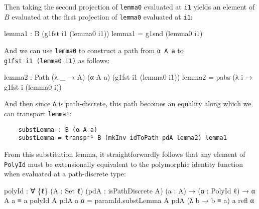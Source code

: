 \documentclass[
  12pt]{article}
\newenvironment{Shaded}{\begin{snugshade}}{\end{snugshade}}
\newcommand{\DataTypeTok}[1]{\textcolor[rgb]{0.00,0.34,0.68}{#1}}
\newcommand{\NormalTok}[1]{\textcolor[rgb]{0.12,0.11,0.11}{#1}}
\newcommand{\OtherTok}[1]{\textcolor[rgb]{0.00,0.43,0.16}{#1}}
\begin{document}
Then taking the second projection of \texttt{lemma0} evaluated at
\texttt{i1} yields an element of \(B\) evaluated at the first projection
of \texttt{lemma0} evaluated at \texttt{i1}:

\begin{Shaded}
\begin{Highlighting}[]
\NormalTok{    lemma1 }\OtherTok{:}\NormalTok{ B }\OtherTok{(}\NormalTok{g1fst i1 }\OtherTok{(}\NormalTok{lemma0 i1}\OtherTok{))}
\NormalTok{    lemma1 }\OtherTok{=}\NormalTok{ g1snd }\OtherTok{(}\NormalTok{lemma0 i1}\OtherTok{)}
\end{Highlighting}
\end{Shaded}

And we can use \texttt{lemma0} to construct a path from \texttt{α\ A\ a}
to \texttt{g1fst\ i1\ (lemma0\ i1)} as follows:

\begin{Shaded}
\begin{Highlighting}[]
\NormalTok{    lemma2 }\OtherTok{:}\NormalTok{ Path }\OtherTok{(λ} \OtherTok{\_} \OtherTok{→}\NormalTok{ A}\OtherTok{)} \OtherTok{(}\NormalTok{α A a}\OtherTok{)} \OtherTok{(}\NormalTok{g1fst i1 }\OtherTok{(}\NormalTok{lemma0 i1}\OtherTok{))}
\NormalTok{    lemma2 }\OtherTok{=}\NormalTok{ pabs }\OtherTok{(λ}\NormalTok{ i }\OtherTok{→}\NormalTok{ g1fst i }\OtherTok{(}\NormalTok{lemma0 i}\OtherTok{))}
\end{Highlighting}
\end{Shaded}

And then since \texttt{A} is path-discrete, this path becomes an
equality along which we can transport \texttt{lemma1}:

\begin{verbatim}
    substLemma : B (α A a)
    substLemma = transp⁻¹ B (mkInv idToPath pdA lemma2) lemma1
\end{verbatim}

From this substitution lemma, it straightforwardly follows that any
element of \texttt{PolyId} must be extensionally equivalent to the
polymorphic identity function when evaluated at a path-discrete type:

\begin{Shaded}
\begin{Highlighting}[]
\NormalTok{polyId }\OtherTok{:} \OtherTok{∀} \OtherTok{\{}\NormalTok{ℓ}\OtherTok{\}} \OtherTok{(}\NormalTok{A }\OtherTok{:} \DataTypeTok{Set}\NormalTok{ ℓ}\OtherTok{)} \OtherTok{(}\NormalTok{pdA }\OtherTok{:}\NormalTok{ isPathDiscrete A}\OtherTok{)} \OtherTok{(}\NormalTok{a }\OtherTok{:}\NormalTok{ A}\OtherTok{)}
         \OtherTok{→} \OtherTok{(}\NormalTok{α }\OtherTok{:}\NormalTok{ PolyId ℓ}\OtherTok{)} \OtherTok{→}\NormalTok{ α A a ≡ a}
\NormalTok{polyId A pdA a α }\OtherTok{=}\NormalTok{ paramId}\OtherTok{.}\NormalTok{substLemma A pdA }\OtherTok{(λ}\NormalTok{ b }\OtherTok{→}\NormalTok{ b ≡ a}\OtherTok{)}\NormalTok{ a refl α}
\end{Highlighting}
\end{Shaded}
\end{document}
